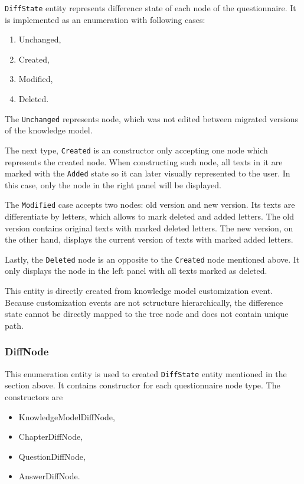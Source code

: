 \texttt{DiffState} entity represents difference state of each node of the questionnaire.
It is implemented as an enumeration with following cases:

\begin{enumerate}
    \item Unchanged,
    \item Created,
    \item Modified,
    \item Deleted.
\end{enumerate}

The \texttt{Unchanged} represents node, which was not edited between migrated versions of the knowledge model.

The next type, \texttt{Created} is an constructor only accepting one node which represents the created node.
When constructing such node, all texts in it are marked with the \texttt{Added} state so it can later visually represented to the user.
In this case, only the node in the right panel will be displayed.

The \texttt{Modified} case accepts two nodes: old version and new version.
Its texts are differentiate by letters, which allows to mark deleted and added letters.
The old version contains original texts with marked deleted letters.
The new version, on the other hand, displays the current version of texts with marked added letters.

Lastly, the \texttt{Deleted} node is an opposite to the \texttt{Created} node mentioned above.
It only displays the node in the left panel with all texts marked as deleted.

This entity is directly created from knowledge model customization event.
Because customization events are not sctructure hierarchically, the difference state cannot be directly mapped to the tree node and does not contain unique path.

\subsubsection*{DiffNode}

This enumeration entity is used to created \texttt{DiffState} entity mentioned in the section above.
It contains constructor for each questionnaire node type.
The constructors are

\begin{itemize}
    \item KnowledgeModelDiffNode,
    \item ChapterDiffNode,
    \item QuestionDiffNode,
    \item AnswerDiffNode.
\end{itemize}


